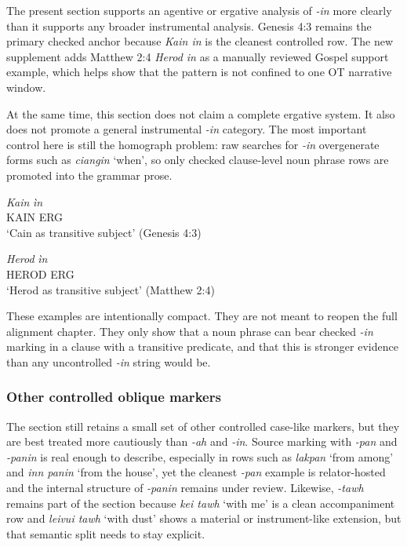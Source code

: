 \documentclass[
  11pt,
  a4paper,
]{article}
\newcommand{\tdim}[1]{\textit{#1}}
\newcommand{\tdimword}[1]{\textit{#1}}
\renewcommand{\textsc}[1]{{\footnotesize\MakeUppercase{#1}}}
\newcommand{\glossquote}[1]{`#1'}
\begin{document}
The present section supports an agentive or ergative analysis of
\tdim{-in} more clearly than it supports any broader instrumental
analysis. Genesis 4:3 remains the primary checked anchor because
\tdim{Kain in} is the cleanest controlled row. The new supplement adds
Matthew 2:4 \tdim{Herod in} as a manually reviewed Gospel support
example, which helps show that the pattern is not confined to one OT
narrative window.

At the same time, this section does not claim a complete ergative
system. It also does not promote a general instrumental \tdim{-in}
category. The most important control here is still the homograph
problem: raw searches for \tdim{-in} overgenerate forms such as
\tdim{ciangin} \glossquote{when}, so only checked clause-level noun
phrase rows are promoted into the grammar prose.

\begin{exe}
\ex \label{ex:case-in-kain}
\gll \tdimword{Kain} \tdimword{ìn} \\
     \textsc{kain} \textsc{erg} \\
\glt \glossquote{Cain as transitive subject} (Genesis 4:3)
\end{exe}

\begin{exe}
\ex \label{ex:case-in-herod}
\gll \tdimword{Herod} \tdimword{ìn} \\
     \textsc{herod} \textsc{erg} \\
\glt \glossquote{Herod as transitive subject} (Matthew 2:4)
\end{exe}

These examples are intentionally compact. They are not meant to reopen
the full alignment chapter. They only show that a noun phrase can bear
checked \tdim{-in} marking in a clause with a transitive predicate, and
that this is stronger evidence than any uncontrolled \tdim{-in} string
would be.

\subsubsection{Other controlled oblique
markers}\label{other-controlled-oblique-markers}

The section still retains a small set of other controlled case-like
markers, but they are best treated more cautiously than \tdim{-ah} and
\tdim{-in}. Source marking with \tdim{-pan} and \tdim{-panin} is real
enough to describe, especially in rows such as \tdim{lakpan}
\glossquote{from among} and \tdim{inn panin}
\glossquote{from the house}, yet the cleanest \tdim{-pan} example is
relator-hosted and the internal structure of \tdim{-panin} remains under
review. Likewise, \tdim{-tawh} remains part of the section because
\tdim{kei tawh} \glossquote{with me} is a clean accompaniment row and
\tdim{leivui tawh} \glossquote{with dust} shows a material or
instrument-like extension, but that semantic split needs to stay
explicit.
\end{document}
